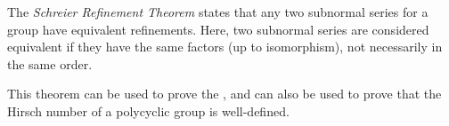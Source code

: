 \documentclass[12pt]{article}
\begin{document}

The \emph{Schreier Refinement Theorem} states that any two subnormal series for a group have equivalent refinements.
Here, two subnormal series are considered equivalent if they have the same factors (up to isomorphism), not necessarily in the same order.

This theorem can be used to prove the , and can also be used to prove that the Hirsch number of a polycyclic group is well-defined.
\end{document}
